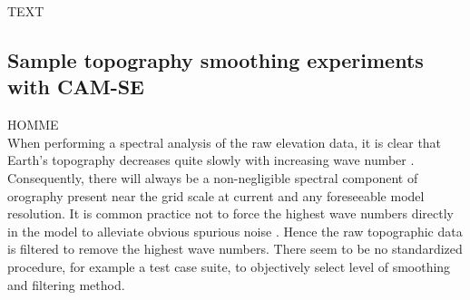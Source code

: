 \documentclass[gmd]{copernicus}
\begin{document}
TEXT

\subsection{Sample topography smoothing experiments with CAM-SE}
HOMME \citep[High-Order Method Modeling Environment; ][]{HOMME,DetAl2005IJHPCA}\\

When performing a spectral analysis of the raw elevation data, it is clear that Earth's topography decreases quite slowly with increasing wave number \citet[see, e.g., ][]{B1993GRL}. Consequently, there will always be a non-negligible spectral component of orography present near the grid scale at current and any foreseeable model resolution. It is common practice not to force the highest wave numbers directly in the model to alleviate obvious spurious noise \citep[e.g.][]{NSM1994JC,LH1997MWR}. Hence the raw topographic data is filtered to remove the highest wave numbers. There seem to be no standardized procedure, for example a test case suite, to objectively select level of smoothing and filtering method. 
\end{document}
